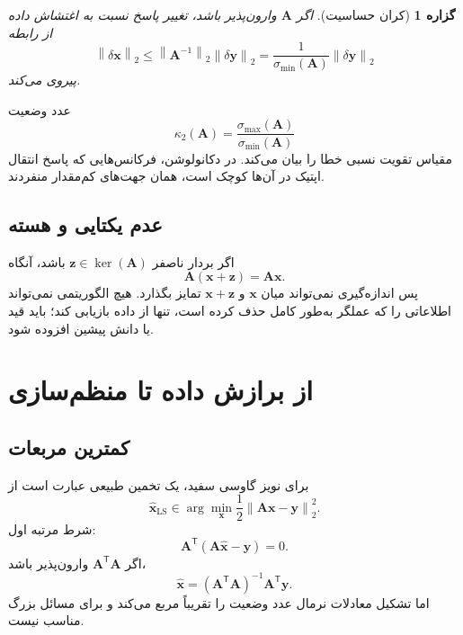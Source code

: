 \documentclass[12pt,openany,oneside]{book}
\newtheorem{proposition}{گزاره}[chapter]
\newcommand{\norm}[1]{\left\lVert #1\right\rVert}
\newcommand{\trans}{^{\mathsf T}}
\newcommand{\vect}[1]{\bm{#1}}
\begin{document}
\begin{proposition}[کران حساسیت]
اگر \(\vect A\) وارون‌پذیر باشد، تغییر پاسخ نسبت به اغتشاش داده از رابطه
\begin{equation}
\norm{\delta\vect x}_2
\le \norm{\vect A^{-1}}_2\norm{\delta\vect y}_2
=\frac{1}{\sigma_{\min}(\vect A)}\norm{\delta\vect y}_2
\end{equation}
پیروی می‌کند.
\end{proposition}

عدد وضعیت
\begin{equation}
\kappa_2(\vect A)=\frac{\sigma_{\max}(\vect A)}{\sigma_{\min}(\vect A)}
\end{equation}
مقیاس تقویت نسبی خطا را بیان می‌کند. در دکانولوشن، فرکانس‌هایی که پاسخ انتقال اپتیک در آن‌ها کوچک است، همان جهت‌های کم‌مقدار منفردند.

\subsection{عدم یکتایی و هسته}

اگر بردار ناصفر \(\vect z\in\ker(\vect A)\) باشد، آنگاه
\begin{equation}
\vect A(\vect x+\vect z)=\vect A\vect x.
\end{equation}
پس اندازه‌گیری نمی‌تواند میان \(\vect x\) و \(\vect x+\vect z\) تمایز بگذارد.
هیچ الگوریتمی نمی‌تواند اطلاعاتی را که عملگر به‌طور کامل حذف کرده است، تنها از داده بازیابی کند؛
باید قید یا دانش پیشین افزوده شود.

\section{از برازش داده تا منظم‌سازی}

\subsection{کمترین مربعات}

برای نویز گاوسی سفید، یک تخمین طبیعی عبارت است از
\begin{equation}
\widehat{\vect x}_{\mathrm{LS}}
\in\arg\min_{\vect x}\frac12\norm{\vect A\vect x-\vect y}_2^2.
\end{equation}
شرط مرتبه اول:
\begin{equation}
\vect A\trans(\vect A\widehat{\vect x}-\vect y)=0.
\end{equation}
اگر \(\vect A\trans\vect A\) وارون‌پذیر باشد،
\begin{equation}
\widehat{\vect x}=(\vect A\trans\vect A)^{-1}\vect A\trans\vect y.
\end{equation}
اما تشکیل معادلات نرمال عدد وضعیت را تقریباً مربع می‌کند و برای مسائل بزرگ مناسب نیست.
\end{document}
